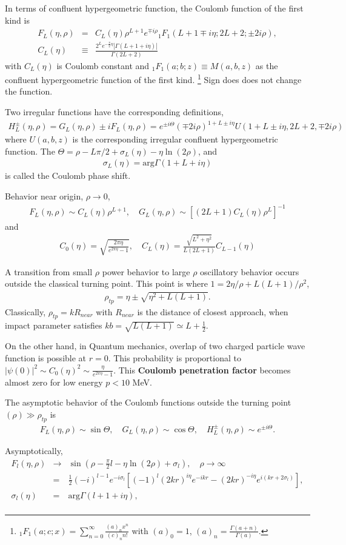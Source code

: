 \documentclass[10pt]{article}
\newcommand{\bea}{\begin{eqnarray}}
\newcommand{\eea}{\end{eqnarray}}
\newcommand{\no}{\nonumber \\}
\begin{document}
In terms of confluent hypergeometric function, 
the Coulomb function of the first kind is
\bea
F_L(\eta,\rho)&=&C_L(\eta) \rho^{L+1} e^{\mp i\rho}
         {}_1F_1(L+1\mp i\eta;2L+2; \pm 2i\rho),\no
C_L(\eta)&\equiv& \frac{2^L e^{-\frac{\pi}{2}\eta}|\Gamma(L+1+i\eta)|}
                       {\Gamma(2L+2)}
\eea
with $C_L(\eta)$ is Coulomb constant and
$_1F_1(a;b;z)\equiv M(a,b,z)$ as the 
confluent hypergeometric function of the first kind.
\footnote{
$_1F_1(a;c;x)=\sum_{n=0}^\infty \frac{(a)_n x^n}{(c)_n n!}$
with $(a)_0=1$, $(a)_n=\frac{\Gamma(a+n)}{\Gamma(a)}$.
} Sign does does not change the function.

Two irregular functions have the corresponding definitions,
\bea
H_L^{\pm}(\eta,\rho)
=G_L(\eta,\rho)\pm i F_L(\eta,\rho)
=e^{\pm i \Theta}(\mp 2i \rho)^{1+L\pm i\eta}
 U(1+L\pm i\eta,2L+2,\mp 2i\rho) 
\eea
where $U(a,b,z)$ is the corresponding irregular confluent hypergeometric function. 
The $\Theta=\rho-L\pi/2+\sigma_L(\eta)-\eta\ln(2\rho)$,
and 
\bea
\sigma_L(\eta)=\mbox{arg} \Gamma(1+L+i\eta)
\eea
is called the Coulomb phase shift.

Behavior near origin, $\rho\to 0$,
\bea
F_L(\eta,\rho)\sim C_L(\eta) \rho^{L+1},
\quad G_L(\eta,\rho)\sim [(2L+1)C_L(\eta)\rho^L]^{-1}
\eea
and
\bea
C_0(\eta)=\sqrt{\frac{2\pi\eta}{e^{2\pi\eta}-1}},
\quad C_L(\eta)=\frac{\sqrt{L^2+\eta^2}}{L(2L+1)} C_{L-1}(\eta)
\eea

A transition from small $\rho$ power behavior to large $\rho$
oscillatory behavior occurs outside the classical turning point.
This point is where $1=2\eta/\rho+L(L+1)/\rho^2$,
\bea
\rho_{tp}=\eta\pm \sqrt{\eta^2+L(L+1)}.
\eea
Classically, $\rho_{tp}=kR_{near}$ with $R_{near}$ is the distance
of closest approach, when impact parameter satisfies
$kb=\sqrt{L(L+1)}\simeq L+\frac{1}{2}$.

On the other hand, in Quantum mechanics,
overlap of two charged particle wave function is possible at $r=0$.
This probability is proportional to 
$|\psi(0)|^2\sim C_0(\eta)^2\sim \frac{\eta}{e^{2\pi\eta}-1}$.
This {\bf Coulomb penetration factor} 
becomes almost zero for low energy $p<10$ MeV.

The asymptotic behavior of the Coulomb functions 
outside the turning point $(\rho)\gg \rho_{tp}$ is
\bea
F_L(\eta,\rho)\sim \sin\Theta,\quad
G_L(\eta,\rho)\sim \cos\Theta,\quad
H_L^{\pm}(\eta,\rho)\sim e^{\pm i\Theta}.
\eea

Asymptotically,
\bea
F_l(\eta,\rho)&\to&
  \sin(\rho-\frac{\pi}{2}l-\eta\ln(2\rho)+\sigma_l),
  \quad {\rho\to \infty}\no
    &=&\frac{1}{2}(-i)^{l-1} e^{-i\sigma_l}
    [(-1)^l(2kr)^{i\eta}e^{-ikr}
    -(2kr)^{-i\eta} e^{i(kr+2\sigma_l)}
    ],\no
  \sigma_l(\eta)&=&\mbox{arg} \Gamma(l+1+i\eta),\no
\eea
\end{document}

